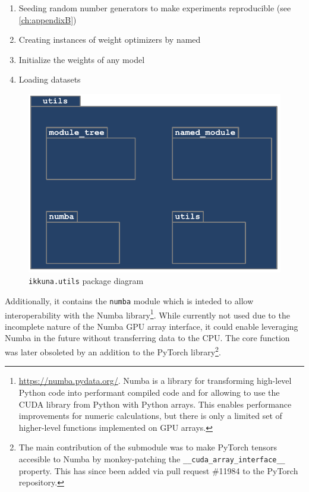 \begin{enumerate}
    \item
        Seeding random number generators to make experiments reproducible (see
        \cref{ch:appendixB})
    \item
        Creating instances of weight optimizers by named
    \item
        Initialize the weights of any model
    \item
        Loading datasets
\end{enumerate}

\begin{figure}
    \hypertarget{fig:pack-diag-utils}{%
        \centering
        \includegraphics[max width=.7\textwidth]{gfx/diagrams/class_diagrams/utils_package_diagram.pdf}
        \caption{\texttt{ikkuna.utils} package diagram}\label{fig:pack-diag-utils}
    }
\end{figure}

Additionally, it contains the \texttt{numba} module
which is inteded to allow interoperability with the Numba
library\footnote{\url{https://numba.pydata.org/}. Numba is a library for
    transforming high-level Python code into performant compiled code and
    for allowing to use the CUDA library from Python with Python arrays.
    This enables performance improvements for numeric calculations, but
    there is only a limited set of higher-level functions implemented on
GPU arrays.}. While currently not used due to the incomplete nature of
the Numba GPU array interface, it could enable leveraging Numba in the
future without transferring data to the CPU. The core function was later
obsoleted by an addition to the PyTorch library\footnote{The main contribution
of the submodule was to make PyTorch tensors accesible to Numba by
monkey-patching the \lstinline{__cuda_array_interface__} property. This has since
been added via pull request \#11984 to the PyTorch repository.}.

